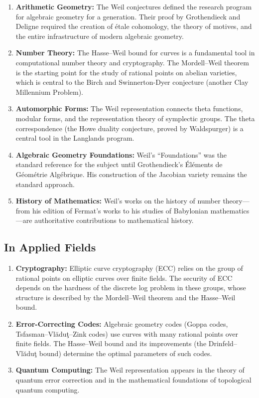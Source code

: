 \begin{enumerate}
    \item \textbf{Arithmetic Geometry:} The Weil conjectures defined the research program for algebraic geometry for a generation. Their proof by Grothendieck and Deligne required the creation of \'{e}tale cohomology, the theory of motives, and the entire infrastructure of modern algebraic geometry.
    
    \item \textbf{Number Theory:} The Hasse--Weil bound for curves is a fundamental tool in computational number theory and cryptography. The Mordell--Weil theorem is the starting point for the study of rational points on abelian varieties, which is central to the Birch and Swinnerton-Dyer conjecture (another Clay Millennium Problem).
    
    \item \textbf{Automorphic Forms:} The Weil representation connects theta functions, modular forms, and the representation theory of symplectic groups. The theta correspondence (the Howe duality conjecture, proved by Waldspurger) is a central tool in the Langlands program.
    
    \item \textbf{Algebraic Geometry Foundations:} Weil's ``Foundations'' was the standard reference for the subject until Grothendieck's {\'E}l\'{e}ments de G\'{e}om\'{e}trie Alg\'{e}brique. His construction of the Jacobian variety remains the standard approach.
    
    \item \textbf{History of Mathematics:} Weil's works on the history of number theory---from his edition of Fermat's works to his studies of Babylonian mathematics---are authoritative contributions to mathematical history.
\end{enumerate}

\subsection{In Applied Fields}

\begin{enumerate}
    \item \textbf{Cryptography:} Elliptic curve cryptography (ECC) relies on the group of rational points on elliptic curves over finite fields. The security of ECC depends on the hardness of the discrete log problem in these groups, whose structure is described by the Mordell--Weil theorem and the Hasse--Weil bound.
    
    \item \textbf{Error-Correcting Codes:} Algebraic geometry codes (Goppa codes, Tsfasman--Vl\u{a}du\c{t}--Zink codes) use curves with many rational points over finite fields. The Hasse--Weil bound and its improvements (the Drinfeld--Vl\u{a}du\c{t} bound) determine the optimal parameters of such codes.
    
    \item \textbf{Quantum Computing:} The Weil representation appears in the theory of quantum error correction and in the mathematical foundations of topological quantum computing.
\end{enumerate}

